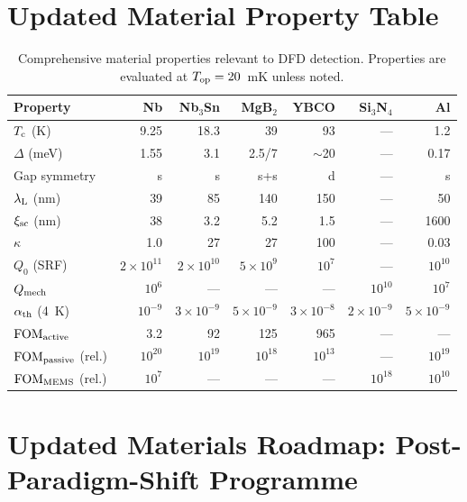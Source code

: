 \documentclass[11pt]{article}
\theoremstyle{definition}
\theoremstyle{remark}
\newcommand{\ee}[1]{\times 10^{#1}}
\newcommand{\Tc}{T_{\rm c}}
\newcommand{\lambdaL}{\lambda_{\rm L}}
\newcommand{\FOMactive}{\mathrm{FOM}_{\rm active}}
\newcommand{\FOMpassive}{\mathrm{FOM}_{\rm passive}}
\newcommand{\FOMMEMS}{\mathrm{FOM}_{\rm MEMS}}
\begin{document}
\section{Updated Material Property Table}
\label{sec:property_table}

\begin{table}[H]
\centering
\caption{Comprehensive material properties relevant to DFD detection.
Properties are evaluated at $T_{\rm op} = 20$~mK unless noted.}
\label{tab:properties}
\renewcommand{\arraystretch}{1.2}
\begin{tabular}{p{2.2cm}rrrrrr}
\toprule
Property & Nb & Nb$_3$Sn & MgB$_2$ & YBCO & Si$_3$N$_4$ & Al \\
\midrule
$\Tc$ (K) & 9.25 & 18.3 & 39 & 93 & --- & 1.2 \\
$\Delta$ (meV) & 1.55 & 3.1 & 2.5/7 & $\sim$20 & --- & 0.17 \\
Gap symmetry & s & s & s+s & d & --- & s \\
$\lambdaL$ (nm) & 39 & 85 & 140 & 150 & --- & 50 \\
$\xi_{\rm sc}$ (nm) & 38 & 3.2 & 5.2 & 1.5 & --- & 1600 \\
$\kappa$ & 1.0 & 27 & 27 & 100 & --- & 0.03 \\
$Q_0$ (SRF) & $2\ee{11}$ & $2\ee{10}$ & $5\ee{9}$ & $10^7$ & --- & $10^{10}$ \\
$Q_{\rm mech}$ & $10^6$ & --- & --- & --- & $10^{10}$ & $10^7$ \\
$\alpha_{\rm th}$ (4~K) & $10^{-9}$ & $3\ee{-9}$ & $5\ee{-9}$ & $3\ee{-8}$ & $2\ee{-9}$ & $5\ee{-9}$ \\
\midrule
$\FOMactive$ & 3.2 & 92 & 125 & 965 & --- & --- \\
$\FOMpassive$ (rel.) & $10^{20}$ & $10^{19}$ & $10^{18}$ & $10^{13}$ & --- & $10^{19}$ \\
$\FOMMEMS$ (rel.) & $10^{7}$ & --- & --- & --- & $10^{18}$ & $10^{10}$ \\
\bottomrule
\end{tabular}
\end{table}


\section{Updated Materials Roadmap: Post-Paradigm-Shift Programme}
\label{sec:roadmap}
\end{document}
